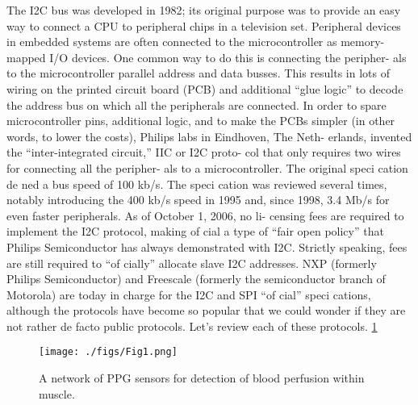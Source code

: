 \documentclass{IEEEtran}
\begin{document}
The I2C bus was developed in 1982; its original purpose was to provide an easy way to connect a CPU to peripheral chips in a television set. Peripheral devices in embedded systems are often connected to the microcontroller as memory-mapped I/O devices. One common way to do this is connecting the peripher- als to the microcontroller parallel address and data busses. This results in lots of wiring on the printed circuit board (PCB) and additional “glue logic” to decode the address bus on which all the peripherals are connected. In order to spare microcontroller pins, additional logic, and to make the PCBs simpler (in other words, to lower the costs), Philips labs in Eindhoven, The Neth- erlands, invented the “inter-integrated circuit,” IIC or I2C proto- col that only requires two wires for connecting all the peripher- als to a microcontroller. The original speci cation de ned a bus speed of 100 kb/s. The speci cation was reviewed several times, notably introducing the 400 kb/s speed in 1995 and, since 1998, 3.4 Mb/s for even faster peripherals. As of October 1, 2006, no li- censing fees are required to implement the I2C protocol, making of cial a type of “fair open policy” that Philips Semiconductor has always demonstrated with I2C. Strictly speaking, fees are still required to “of cially” allocate slave I2C addresses.
NXP (formerly Philips Semiconductor) and Freescale (formerly the semiconductor branch of Motorola) are today in charge for the I2C and SPI “of cial” speci cations, although the protocols have become so popular that we could wonder if they are not rather de facto public protocols. Let’s review each of these protocols. \ref{fig:SPI protocol}

\begin{figure}[h!]
\centering
\texttt{[image: ./figs/Fig1.png]}
\caption{ A network of PPG sensors for detection of blood perfusion within muscle. }
\label{fig:SPI protocol}
\end{figure}
\end{document}
